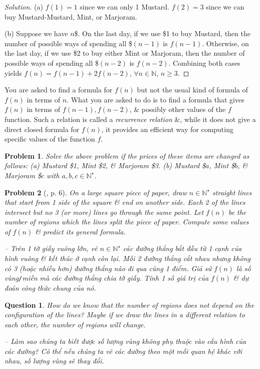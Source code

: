 \documentclass[oneside]{book}
\newtheorem{problem}{Problem}
\newtheorem{question}{Question}
\begin{document}
\begin{proof}[Solution]
	(a) $f(1) = 1$ since we can only 1 Mustard. $f(2) = 3$ since we can buy Mustard-Mustard, Mint, or Marjoram.
	\item(b) Suppose we have $n$\$. On the last day, if we use \$1 to buy Mustard, then the number of possible ways of spending all \$$(n - 1)$ is $f(n - 1)$. Otherwise, on the last day, if we use \$2 to buy either Mint or Marjoram, then the number of possible ways of spending all \$$(n - 2)$ is $f(n - 2)$. Combining both cases yields $f(n) = f(n - 1) + 2f(n - 2)$, $\forall n\in\mathbb{N}$, $n\ge3$.
\end{proof}
You are asked to find a formula for $f(n)$ but not the usual kind of formula of $f(n)$ in terms of $n$. What you are asked to do is to find a formula that gives $f(n)$ in terms of $f(n - 1),f(n - 2)$, \& possibly other values of the $f$ function. Such a relation is called a {\it recurrence relation} \&, while it does not give a direct closed formula for $f(n)$, it provides an efficient way for computing specific values of the function $f$. 

\begin{problem}
	Solve the above problem if the prices of these items are changed as follows: (a) Mustard \$1, Mint \$2, \& Marjoram \$3. (b) Mustard \$$a$, Mint \$$b$, \& Marjoram \$$c$ with $a,b,c\in\mathbb{N}^\star$. 
\end{problem}

\begin{problem}[\cite{Shahriari2022}, p. 6]
	On a large square piece of paper, draw $n\in\mathbb{N}^\star$ straight lines that start from 1 side of the square \& end on another side. Each 2 of the lines intersect but no 3 (or more) lines go through the same point. Let $f(n)$ be the number of regions which the lines split the piece of paper. Compute some values of $f(n)$ \& predict its general formula.
	
	-- Trên 1 tờ giấy vuông lớn, vẽ $n\in\mathbb{N}^\star$ các đường thẳng bắt đầu từ 1 cạnh của hình vuông \& kết thúc ở cạnh còn lại. Mỗi 2 đường thẳng cắt nhau nhưng không có 3 (hoặc nhiều hơn) đường thẳng nào đi qua cùng 1 điểm. Giả sử $f(n)$ là số vùng{\tt/}miền mà các đường thẳng chia tờ giấy. Tính 1 số giá trị của $f(n)$ \& dự đoán công thức chung của nó.
\end{problem}

\begin{question}
	How do we know that the number of regions does not depend on the configuration of the lines? Maybe if we draw the lines in a different relation to each other, the number of regions will change.
	
	-- Làm sao chúng ta biết được số lượng vùng không phụ thuộc vào cấu hình của các đường? Có thể nếu chúng ta vẽ các đường theo một mối quan hệ khác với nhau, số lượng vùng sẽ thay đổi.
\end{question}
\end{document}
